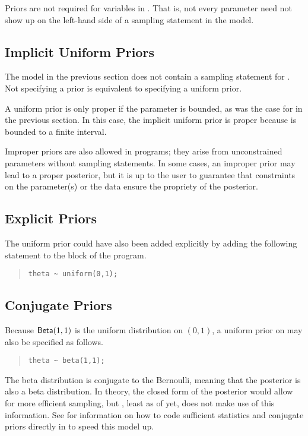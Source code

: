 Priors are not required for variables in \Stan.  That is, not every
parameter need not show up on the left-hand side of a sampling
statement in the model.  

\subsection{Implicit Uniform Priors}

The model in the previous section does not contain a sampling
statement for .  Not specifying a prior is equivalent to
specifying a uniform prior.  

A uniform prior is only proper if the parameter is bounded, as was the
case for  in the previous section.  In this case, the
implicit uniform prior is proper because  is bounded to a
finite interval.

Improper priors are also allowed in \Stan programs; they arise from
unconstrained parameters without sampling statements.  In some cases,
an improper prior may lead to a proper posterior, but it is up to the
user to guarantee that constraints on the parameter(s) or the data
ensure the propriety of the posterior.

\subsection{Explicit Priors}

The uniform prior could have also been added explicitly by adding the
following statement to the  block of the program.
%
\begin{quote}
\begin{Verbatim} 
theta ~ uniform(0,1);
\end{Verbatim}
\end{quote}
% 

\subsection{Conjugate Priors}

Because $\mbox{\sf Beta}(1,1)$ is the uniform distribution on $(0,1)$,
a uniform prior on  may also be specified as follows.
%
\begin{quote}
\begin{Verbatim}
theta ~ beta(1,1);
\end{Verbatim}
\end{quote}
%
The beta distribution is conjugate to the Bernoulli, meaning that the
posterior is also a beta distribution.  In theory, the closed form of
the posterior would allow for more efficient sampling, but \Stan,
least as of yet, does not make use of this information.  See
 for information on how to code sufficient
statistics and conjugate priors directly in \Stan to speed this model up.





